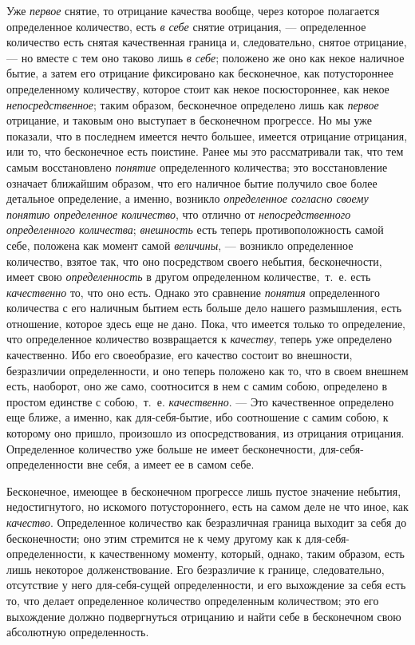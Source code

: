 {Уже {\em первое} снятие, то отрицание качества вообще,
через которое полагается определенное количество, есть
{\em в себе} снятие отрицания, — определенное
количество есть снятая качественная граница и, следовательно, снятое
отрицание, — но вместе с тем оно таково лишь {\em в
себе}; положено же оно как некое наличное бытие, а затем его отрицание
фиксировано как бесконечное, как потустороннее определенному количеству,
которое стоит как некое посюстороннее, как некое
{\em непосредственное}; таким образом, бесконечное
определено лишь как {\em первое} отрицание, и таковым
оно выступает в бесконечном прогрессе. Но мы уже показали, что в последнем
имеется нечто большее, имеется отрицание отрицания, или то, что бесконечное
есть поистине. Ранее мы это рассматривали так, что тем самым восстановлено
{\em понятие} определенного количества; это
восстановление означает ближайшим образом, что его наличное бытие получило
свое более детальное определение, а именно, возникло
{\em определенное согласно своему понятию определенное
количество}, что отлично от {\em непосредственного
определенного количества}; {\em внешность} есть теперь
противоположность самой себе, положена как момент самой
{\em величины}, — возникло определенное количество,
взятое так, что оно посредством своего небытия, бесконечности, имеет свою
{\em определенность} в другом определенном
количестве,~т.~е. есть {\em качественно} то, что оно
есть. Однако это сравнение {\em понятия} определенного
количества с его наличным бытием есть больше дело нашего размышления, есть
отношение, которое здесь еще не дано. Пока, что имеется только то
определение, что определенное количество возвращается к
{\em качеству}, теперь уже определено качественно. Ибо
его своеобразие, его качество состоит во внешности, безразличии
определенности, и оно теперь положено как то, что в своем внешнем есть,
наоборот, оно же само, соотносится в нем с самим собою, определено в
простом единстве с собою,~т.~е. {\em качественно}. —
Это качественное определено еще ближе, а именно, как для-себя-бытие, ибо
соотношение с самим собою, к которому оно пришло, произошло из
опосредствования, из отрицания отрицания. Определенное количество уже
больше не имеет бесконечности, для-себя-определенности вне себя, а имеет ее
в самом себе.

Бесконечное, имеющее в бесконечном прогрессе лишь пустое значение небытия,
недостигнутого, но искомого потустороннего, есть на самом деле не что иное,
как {\em качество}. Определенное количество как
безразличная граница выходит за себя до бесконечности; оно этим стремится
не к чему другому как к для-себя-определенности, к качественному моменту,
который, однако, таким образом, есть лишь некоторое долженствование. Его
безразличие к границе, следовательно, отсутствие у него для-себя-сущей
определенности, и его выхождение за себя есть то, что делает определенное
количество определенным количеством; это его выхождение должно
подвергнуться отрицанию и найти себе в бесконечном свою абсолютную
определенность.

}
